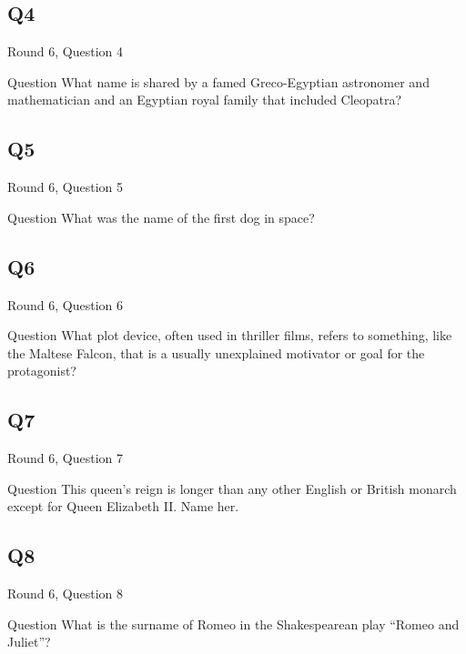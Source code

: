 \documentclass[11pt]{beamer}
\begin{document}
\subsection*{Q4}
\begin{frame}[t]{Round 6, Question 4}
\vspace{2em}
\begin{block}{Question}
What name is shared by a famed Greco-Egyptian astronomer and mathematician and an Egyptian royal family that included Cleopatra\@?
\end{block}
\end{frame}
    

\subsection*{Q5}
\begin{frame}[t]{Round 6, Question 5}
\vspace{2em}
\begin{block}{Question}
What was the name of the first dog in space\@?
\end{block}
\end{frame}
    

\subsection*{Q6}
\begin{frame}[t]{Round 6, Question 6}
\vspace{2em}
\begin{block}{Question}
What plot device, often used in thriller films, refers to something, like the Maltese Falcon, that is a usually unexplained motivator or goal for the protagonist\@?
\end{block}
\end{frame}
    

\subsection*{Q7}
\begin{frame}[t]{Round 6, Question 7}
\vspace{2em}
\begin{block}{Question}
This queen's reign is longer than any other English or British monarch except for Queen Elizabeth II. Name her.
\end{block}
\end{frame}
    

\subsection*{Q8}
\begin{frame}[t]{Round 6, Question 8}
\vspace{2em}
\begin{block}{Question}
What is the surname of Romeo in the Shakespearean play ``Romeo and Juliet''\@?
\end{block}
\end{frame}
    
\end{document}
